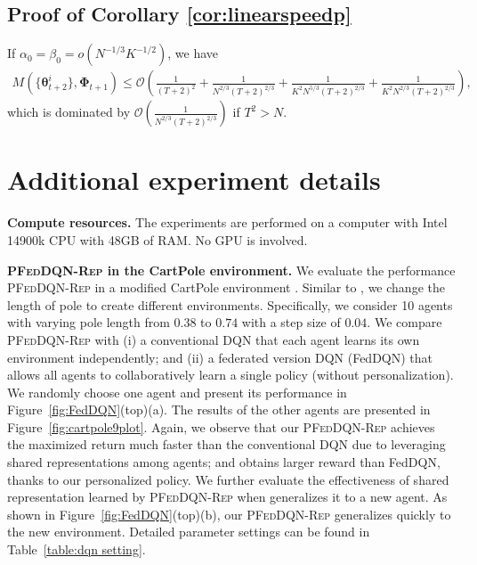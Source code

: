 \documentclass{article} %
\theoremstyle{plain}
\theoremstyle{definition}
\theoremstyle{remark}
\begin{document}
{\subsection{Proof of Corollary \ref{cor:linearspeedp}}

If $\alpha_0=\beta_0=o(N^{-1/3}K^{-1/2})$,
we have
\begin{align*}
     M(\{\pmb{\theta}_{t+2}^i\}, \pmb{\Phi}_{t+1})\leq \mathcal{O}\left(\frac{1}{(T+2)^2}+\frac{1}{N^{2/3}(T+2)^{2/3}}+\frac{1}{K^2N^{5/3}(T+2)^{2/3}}+\frac{1}{K^2N^{2/3}(T+2)^{2/3}}\right), 
\end{align*}
which is dominated by $\mathcal{O}\left(\frac{1}{N^{2/3}(T+2)^{2/3}}\right)$ if $T^2>N$.
\section{Additional experiment details}\label{app:exp}
\textbf{Compute resources.} The experiments are performed on a computer with Intel 14900k CPU with 48GB of RAM. No GPU is involved. 


\textbf{\textsc{PFedDQN-Rep} in the CartPole environment.} We evaluate the performance \textsc{PFedDQN-Rep} in a modified CartPole environment \citep{brockman2016openai}. Similar to \cite{jin2022federated}, we change the length of pole to create different environments. Specifically, we consider 10 agents with varying pole length from $0.38$ to $0.74$ with a step size of $0.04$. We compare \textsc{PFedDQN-Rep} with (i) a conventional DQN that each agent learns its own environment independently; and (ii) a federated version DQN (FedDQN) that allows all agents to collaboratively learn a single policy (without personalization). We randomly choose one agent and present its performance in Figure~\ref{fig:FedDQN}(top)(a). The results of the other agents are presented in Figure~\ref{fig:cartpole9plot}. Again, we observe that our \textsc{PFedDQN-Rep} achieves the maximized return much faster than the conventional DQN due to leveraging shared representations among agents; and obtains larger reward than FedDQN, thanks to our personalized policy.  We further evaluate the effectiveness of shared representation learned by \textsc{PFedDQN-Rep} when generalizes it to a new agent. As shown in Figure~\ref{fig:FedDQN}(top)(b), our \textsc{PFedDQN-Rep} generalizes quickly to the new environment.  Detailed parameter settings can be found in Table~\ref{table:dqn setting}. 




}
\end{document}

